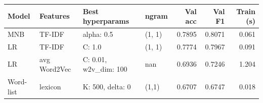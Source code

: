 \begin{tabular}{llllrrr}
\toprule
Model & Features & Best hyperparams & ngram & Val acc & Val F1 & Train (s) \\
\midrule
MNB & TF-IDF & alpha: 0.5 & (1, 1) & 0.7895 & 0.8071 & 0.061 \\
LR & TF-IDF & C: 1.0 & (1, 1) & 0.7774 & 0.7967 & 0.091 \\
LR & avg Word2Vec & C: 0.01, w2v\_dim: 100 & nan & 0.6936 & 0.7246 & 1.204 \\
Word-list & lexicon & K: 500, delta: 0 & (1,1) & 0.6707 & 0.6747 & 0.018 \\
\bottomrule
\end{tabular}
